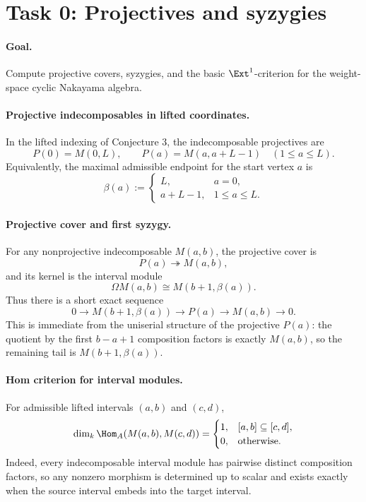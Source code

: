 \section*{Task 0: Projectives and syzygies}

\paragraph{Goal.}
Compute projective covers, syzygies, and the basic \(\Ext^1\)-criterion for the
weight-space cyclic Nakayama algebra.

\paragraph{Projective indecomposables in lifted coordinates.}
In the lifted indexing of Conjecture 3, the indecomposable projectives are
\[
P(0)=M(0,L),
\qquad
P(a)=M(a,a+L-1)\quad (1\le a\le L).
\]
Equivalently, the maximal admissible endpoint for the start vertex \(a\) is
\[
\beta(a):=
\begin{cases}
L, & a=0,\\
a+L-1, & 1\le a\le L.
\end{cases}
\]

\paragraph{Projective cover and first syzygy.}
For any nonprojective indecomposable \(M(a,b)\), the projective cover is
\[
P(a)\twoheadrightarrow M(a,b),
\]
and its kernel is the interval module
\[
\Omega M(a,b)\cong M(b+1,\beta(a)).
\]
Thus there is a short exact sequence
\[
0\longrightarrow M(b+1,\beta(a))
\longrightarrow P(a)
\longrightarrow M(a,b)
\longrightarrow 0.
\]
This is immediate from the uniserial structure of the projective \(P(a)\): the
quotient by the first \(b-a+1\) composition factors is exactly \(M(a,b)\), so
the remaining tail is \(M(b+1,\beta(a))\).

\paragraph{Hom criterion for interval modules.}
For admissible lifted intervals \((a,b)\) and \((c,d)\),
\[
\dim_k \Hom_A(M(a,b),M(c,d))
=
\begin{cases}
1, & [a,b]\subseteq [c,d],\\
0, & \text{otherwise}.
\end{cases}
\]
Indeed, every indecomposable interval module has pairwise distinct composition
factors, so any nonzero morphism is determined up to scalar and exists exactly
when the source interval embeds into the target interval.

